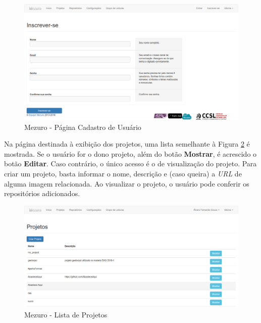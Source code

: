 \begin{figure}[!htb]
	\centering
    \includegraphics[keepaspectratio=true,scale=0.3]
    {figuras/mezuro-cadastro.eps}
  \caption{Mezuro - Página Cadastro de Usuário}
	\label{fig:mezuro-cadastro}
\end{figure}

\newpage

Na página destinada à exibição dos projetos, uma lista semelhante à Figura
\ref{fig:mezuro-projetos-v2} é mostrada. Se o usuário for o dono projeto, além do
botão \textbf{Mostrar}, é acrescido o botão \textbf{Editar}. Caso contrário, o
único acesso é o de visualização do projeto. Para criar um projeto, basta
informar o nome, descrição e (caso queira) a \textit{URL} de alguma imagem
relacionada. Ao visualizar o projeto, o usuário pode conferir os repositórios
adicionados.

\begin{figure}[!htb]
	\centering
    \includegraphics[keepaspectratio=true,scale=0.3]
    {figuras/mezuro-projetos-v2.eps}
  \caption{Mezuro - Lista de Projetos}
	\label{fig:mezuro-projetos-v2}
\end{figure}

